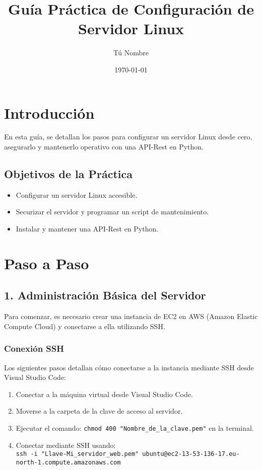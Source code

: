 \documentclass{article}
\title{Guía Práctica de Configuración de Servidor Linux}
\author{Tú Nombre}
\date{\today}
\begin{document}
\maketitle

\section{Introducción}
En esta guía, se detallan los pasos para configurar un servidor Linux desde cero, asegurarlo y mantenerlo operativo con una API-Rest en Python.

\subsection{Objetivos de la Práctica}
\begin{itemize}
  \item Configurar un servidor Linux accesible.
  \item Securizar el servidor y programar un script de mantenimiento.
  \item Instalar y mantener una API-Rest en Python.
\end{itemize}

\section{Paso a Paso}
\subsection{1. Administración Básica del Servidor}
Para comenzar, es necesario crear una instancia de EC2 en AWS (Amazon Elastic Compute Cloud) y conectarse a ella utilizando SSH.

\subsubsection{Conexión SSH}
Los siguientes pasos detallan cómo conectarse a la instancia mediante SSH desde Visual Studio Code:

\begin{enumerate}
  \item Conectar a la máquina virtual desde Visual Studio Code.
  \item Moverse a la carpeta de la clave de acceso al servidor.
  \item Ejecutar el comando: \texttt{chmod 400 "Nombre\_de\_la\_clave.pem"} en la terminal.
  \item Conectar mediante SSH usando: \\
  \texttt{ssh -i "Llave-Mi\_servidor\_web.pem" ubuntu@ec2-13-53-136-17.eu-north-1.compute.amazonaws.com}
\end{enumerate}
\end{document}
